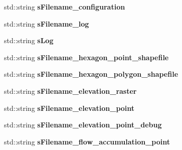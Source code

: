 \begin{DoxyCompactItemize}
\item 
\hypertarget{classhexwatershed_1_1domain_a237356c07d7d19526bc78884cc8e7dc1}{std\-::string {\bfseries s\-Filename\-\_\-configuration}}\label{classhexwatershed_1_1domain_a237356c07d7d19526bc78884cc8e7dc1}

\item 
\hypertarget{classhexwatershed_1_1domain_a807070dbc27d9f921316937879419aa5}{std\-::string {\bfseries s\-Filename\-\_\-log}}\label{classhexwatershed_1_1domain_a807070dbc27d9f921316937879419aa5}

\item 
\hypertarget{classhexwatershed_1_1domain_aee8643251832efafa47400b95dc504d1}{std\-::string {\bfseries s\-Log}}\label{classhexwatershed_1_1domain_aee8643251832efafa47400b95dc504d1}

\item 
\hypertarget{classhexwatershed_1_1domain_addabb6266ed831687398d7e99c7a1eb6}{std\-::string {\bfseries s\-Filename\-\_\-hexagon\-\_\-point\-\_\-shapefile}}\label{classhexwatershed_1_1domain_addabb6266ed831687398d7e99c7a1eb6}

\item 
\hypertarget{classhexwatershed_1_1domain_a81785372d37e465554213628b5226fb5}{std\-::string {\bfseries s\-Filename\-\_\-hexagon\-\_\-polygon\-\_\-shapefile}}\label{classhexwatershed_1_1domain_a81785372d37e465554213628b5226fb5}

\item 
\hypertarget{classhexwatershed_1_1domain_a014fe1eb4dde81d891c97988220d729d}{std\-::string {\bfseries s\-Filename\-\_\-elevation\-\_\-raster}}\label{classhexwatershed_1_1domain_a014fe1eb4dde81d891c97988220d729d}

\item 
\hypertarget{classhexwatershed_1_1domain_a0ddfbc822faa401aa28669bc111165c7}{std\-::string {\bfseries s\-Filename\-\_\-elevation\-\_\-point}}\label{classhexwatershed_1_1domain_a0ddfbc822faa401aa28669bc111165c7}

\item 
\hypertarget{classhexwatershed_1_1domain_a16c36285a4bea563a20d42b68abd52c1}{std\-::string {\bfseries s\-Filename\-\_\-elevation\-\_\-point\-\_\-debug}}\label{classhexwatershed_1_1domain_a16c36285a4bea563a20d42b68abd52c1}

\item 
\hypertarget{classhexwatershed_1_1domain_aa1f8aba1cfe66636ca85daf26e1ca72d}{std\-::string {\bfseries s\-Filename\-\_\-flow\-\_\-accumulation\-\_\-point}}\label{classhexwatershed_1_1domain_aa1f8aba1cfe66636ca85daf26e1ca72d}


\end{DoxyCompactItemize}
